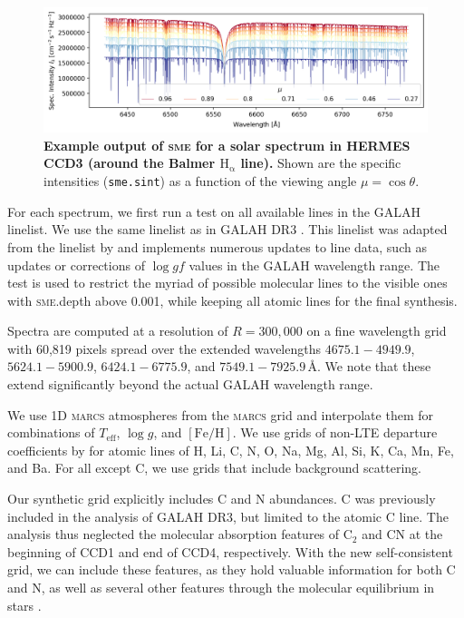 \documentclass[
  journal=pasa,
  manuscript=research-paper, %
  year=2024,
  volume=37
]{cup-journal}
\newcommand{\Teff}{$T_\mathrm{eff}$\xspace}
\newcommand{\logg}{$\log g$\xspace}
\newcommand{\feh}{$\mathrm{[Fe/H]}$\xspace}
\newcommand{\sme}{\textsc{sme}\xspace}
\newcommand{\marcs}{\textsc{marcs}\xspace}
\newcommand{\Angstroem}{\,\text{\AA}}	%
\begin{document}
\begin{figure}[ht]
 \centering
 \includegraphics[width=\textwidth]{figures/solar_twin_specific_intensity.png}
 \caption{\textbf{Example output of \sme for a solar spectrum in HERMES CCD3 (around the Balmer $\mathrm{H}_\upalpha$ line).} Shown are the specific intensities (\texttt{sme.sint}) as a function of the viewing angle $\mu = \cos \theta$. }
 \label{fig:sme_mu_output}
\end{figure}

For each spectrum, we first run a test on all available lines in the GALAH linelist. We use the same linelist as in GALAH DR3 \citep{Buder2021}. This linelist was adapted from the linelist by \citet{Heiter2021} and implements numerous updates to line data, such as updates or corrections of $\log gf$ values in the GALAH wavelength range. The test is used to restrict the myriad of possible molecular lines to the visible ones with \textsc{sme}.depth above 0.001, while keeping all atomic lines for the final synthesis.

Spectra are computed at a resolution of $R = 300,000$ on a fine wavelength grid with 60,819 pixels spread over the extended wavelengths $4675.1-4949.9$, $5624.1-5900.9$, $6424.1-6775.9$, and $7549.1-7925.9 \Angstroem$. We note that these extend significantly beyond the actual GALAH wavelength range.

We use 1D \marcs atmospheres from the \marcs grid \citep[][version 2014]{Gustafsson2008} and interpolate them for combinations of \Teff, \logg, and \feh. We use grids of non-LTE departure coefficients by \citet{Amarsi2020, Amarsi2022} for atomic lines of H, Li, C, N, O, Na, Mg, Al, Si, K, Ca, Mn, Fe, and Ba. For all except C, we use grids that include background scattering.

Our synthetic grid explicitly includes C and N abundances. C was previously included in the analysis of GALAH DR3, but limited to the atomic C line. The analysis thus neglected the molecular absorption features of $\mathrm{C_2}$ and CN at the beginning of CCD1 and end of CCD4, respectively. With the new self-consistent grid, we can include these features, as they hold valuable information for both C and N, as well as several other features through the molecular equilibrium in stars \citep[see e.g.][]{Ting2018}.
\end{document}
